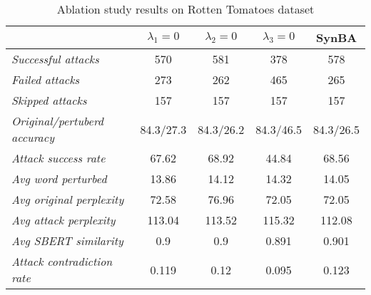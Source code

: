 \begin{table}[h]
    \footnotesize
    \centering
    \begin{tabular}{|l|c|c|c||c|}
        \hline
        {} &           \textbf{$\lambda_1=0$} &   \textbf{$\lambda_2=0$} &   \textbf{$\lambda_3=0$}  & \textbf{SynBA}\\
        \hline \hline
        \emph{Successful attacks}           &    570 &       581 &         378 &         578 \\
        \emph{Failed  attacks}              &    273 &       262 &         465 &         265 \\
        \emph{Skipped  attacks }            &    157 &       157 &         157 &         157 \\
        \emph{Original/pertuberd accuracy}  &   84.3/27.3 &  84.3/26.2 &  84.3/46.5 &  84.3/26.5 \\
        \emph{Attack success rate}          &    67.62 &     68.92 &       44.84 &    68.56 \\
        \emph{Avg word perturbed }          &    13.86 &     14.12 &       14.32 &    14.05 \\
        \emph{Avg original perplexity }     &   72.58 &     76.96 &    72.05 &    72.05 \\
        \emph{Avg attack perplexity}        &  113.04 &         113.52 &     115.32 &   112.08 \\
        \emph{Avg SBERT similarity }        &   0.9 &            0.9 &      0.891 &    0.901 \\
        \emph{Attack contradiction rate}    &  0.119 &           0.12 &      0.095 &    0.123 \\
        \hline
        \end{tabular}

    \caption{Ablation study results on Rotten Tomatoes dataset}
    \label{tab:results-ablation-study}
\end{table}
